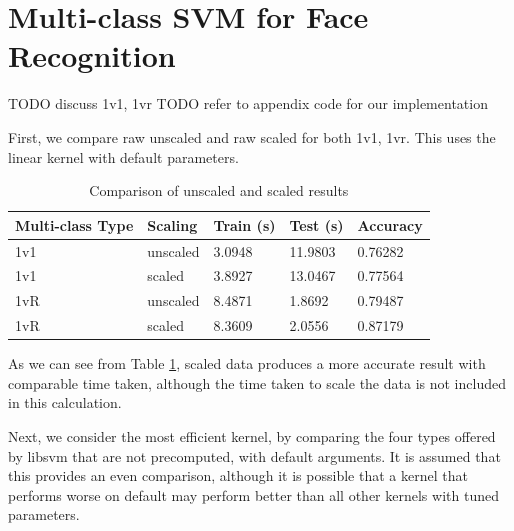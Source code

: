 \documentclass[a4paper, 10pt, conference]{ieeeconf}
\begin{document}


\section{Multi-class SVM for Face Recognition}


TODO discuss 1v1, 1vr
TODO refer to appendix code for our implementation

First, we compare raw unscaled and raw scaled for both 1v1, 1vr. This uses the linear kernel with default parameters.

\begin{table}
\centering
\label{tbl:scaling}
\caption{Comparison of unscaled and scaled results}
\begin{tabular}{lllll}
Multi-class Type & Scaling & Train (s) & Test (s) & Accuracy\\ \hline
1v1 & unscaled & 3.0948 & 11.9803 & 0.76282\\ \hline
1v1 & scaled & 3.8927 & 13.0467 & 0.77564\\ \hline
1vR & unscaled & 8.4871 & 1.8692 & 0.79487\\ \hline
1vR & scaled & 8.3609 & 2.0556 & 0.87179\\ \hline
\end{tabular}
\end{table}

As we can see from Table \ref{tbl:scaling}, scaled data produces a more accurate result with comparable time taken, although the time taken to scale the data is not included in this calculation. 

Next, we consider the most efficient kernel, by comparing the four types offered by libsvm that are not precomputed, with default arguments. It is assumed that this provides an even comparison, although it is possible that a kernel that performs worse on default may perform better than all other kernels with tuned parameters.
\end{document}

